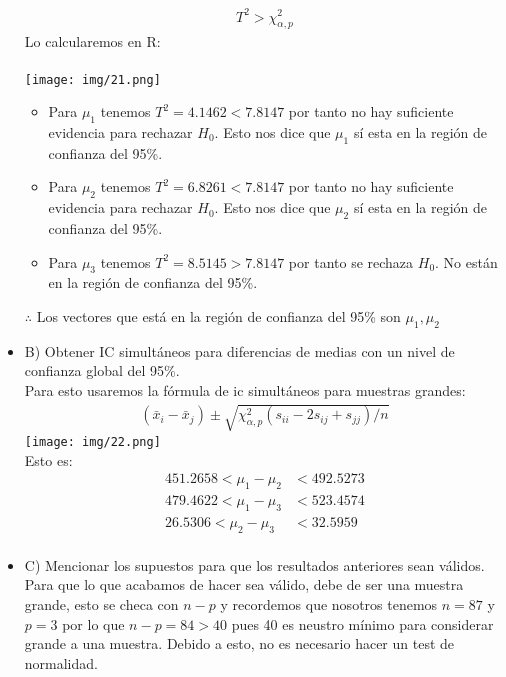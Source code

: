 \begin{sol}
\begin{itemize}
\begin{align*}
T^2 >\chi_{\alpha, p}^2
\end{align*}
Lo calcularemos en R:\\\\
\texttt{[image: img/21.png]}\\
\begin{itemize}
\item Para $\mu_1$ tenemos $T^2=4.1462 < 7.8147$ por tanto no hay suficiente evidencia para rechazar $H_0$. Esto nos dice que $\mu_1$ sí esta en la región de confianza del 95\%.
\item Para $\mu_2$ tenemos $T^2=6.8261< 7.8147$ por tanto no hay suficiente evidencia para rechazar $H_0$. Esto nos dice que $\mu_2$ sí esta en la región de confianza del 95\%.
\item Para $\mu_3$ tenemos $T^2=8.5145 >7.8147$ por tanto se rechaza $H_0$. No están en la región de confianza del 95\%.
\end{itemize} 
$\therefore$ Los vectores que está en la región de confianza del 95\% son $\mu_1,\mu_2$ \pagebreak

\item B) Obtener IC simultáneos para diferencias de medias con un nivel de confianza global del 95\%.\\ 
Para esto usaremos la fórmula de ic simultáneos para muestras grandes:
\begin{align*}
(\bar{x}_i-\bar{x}_j)\pm \sqrt{\chi_{\alpha,p}^2(s_{ii}-2s_{ij}+s_{jj})/n}
\end{align*}
\texttt{[image: img/22.png]}\\
Esto es:
\begin{align*}
451.2658 < \mu_1 - \mu_2 &< 492.5273 \\
479.4622 < \mu_1 - \mu_3 &< 523.4574 \\
26.5306 < \mu_2 - \mu_3 &< 32.5959 \\
\end{align*} \pagebreak

\item C) Mencionar los supuestos para que los resultados anteriores sean válidos. \\
Para que lo que acabamos de hacer sea válido, debe de ser una muestra grande, esto se checa con $n-p$ y recordemos que nosotros tenemos $n=87$ y $p=3$ por lo que $n-p=84>40$ pues 40 es neustro mínimo para considerar grande a una muestra. Debido a esto, no es necesario hacer un test de normalidad.
\end{itemize}

\end{sol}